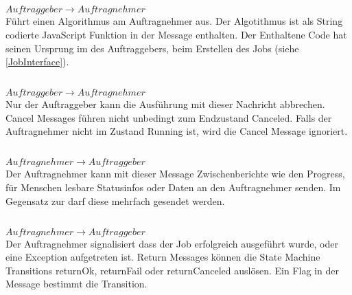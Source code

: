 \begin{multicols}{2}

\subsection{\CallMessage{}}
$Auftraggeber \rightarrow Auftragnehmer$ \\
Führt einen Algorithmus am Auftragnehmer aus.
Der Algotithmus ist als String codierte JavaScript Funktion in der Message enthalten.
Der Enthaltene Code hat seinen Ursprung im \ApplicationLayer{} des Auftraggebers, beim Erstellen des Jobs (siehe \ref{JobInterface}).

\subsection{\CancelMessage{}}
$Auftraggeber \rightarrow Auftragnehmer$ \\
Nur der Auftraggeber kann die Ausführung mit dieser Nachricht abbrechen.
Cancel Messages führen nicht unbedingt zum Endzustand Canceled.
Falls der Auftragnehmer nicht im Zustand Running ist, wird die Cancel Message ignoriert.

\subsection{\UpdateMessage{}}
$Auftragnehmer \rightarrow Auftraggeber$ \\
Der Auftragnehmer kann mit dieser Message Zwischenberichte wie den Progress, für Menschen lesbare Statusinfos oder Daten an den Auftragnehmer senden.
Im Gegensatz zur \ReturnMessage{} darf diese mehrfach gesendet werden.

\subsection{\ReturnMessage{}}
$Auftragnehmer \rightarrow Auftraggeber$ \\
Der Auftragnehmer signalisiert dass der Job erfolgreich ausgeführt wurde, oder eine Exception aufgetreten ist.
Return Messages können die State Machine Transitions returnOk, returnFail oder returnCanceled auslösen.
Ein Flag in der Message bestimmt die Transition.

\end{multicols}


\clearpage
